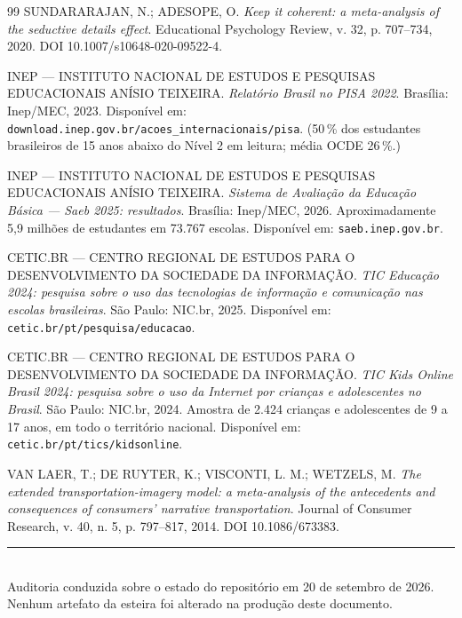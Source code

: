 \documentclass[11pt,a4paper]{article}
\begin{document}
\begin{thebibliography}{99}
SUNDARARAJAN, N.; ADESOPE, O.
\emph{Keep it coherent: a meta-analysis of the seductive details effect}.
Educational Psychology Review, v. 32, p. 707--734, 2020.
DOI 10.1007/s10648-020-09522-4.

INEP --- INSTITUTO NACIONAL DE ESTUDOS E PESQUISAS EDUCACIONAIS AN\'ISIO TEIXEIRA.
\emph{Relat\'orio Brasil no PISA 2022}. Bras\'ilia: Inep/MEC, 2023.
Dispon\'ivel em: \texttt{download.inep.gov.br/acoes\_internacionais/pisa}.
(50\,\% dos estudantes brasileiros de 15 anos abaixo do N\'ivel 2 em leitura; m\'edia OCDE 26\,\%.)

INEP --- INSTITUTO NACIONAL DE ESTUDOS E PESQUISAS EDUCACIONAIS AN\'ISIO TEIXEIRA.
\emph{Sistema de Avalia\c{c}\~ao da Educa\c{c}\~ao B\'asica --- Saeb 2025: resultados}.
Bras\'ilia: Inep/MEC, 2026. Aproximadamente 5,9 milh\~oes de estudantes em 73.767 escolas.
Dispon\'ivel em: \texttt{saeb.inep.gov.br}.

CETIC.BR --- CENTRO REGIONAL DE ESTUDOS PARA O DESENVOLVIMENTO DA SOCIEDADE DA INFORMA\c{C}\~AO.
\emph{TIC Educa\c{c}\~ao 2024: pesquisa sobre o uso das tecnologias de informa\c{c}\~ao e
comunica\c{c}\~ao nas escolas brasileiras}. S\~ao Paulo: NIC.br, 2025.
Dispon\'ivel em: \texttt{cetic.br/pt/pesquisa/educacao}.

CETIC.BR --- CENTRO REGIONAL DE ESTUDOS PARA O DESENVOLVIMENTO DA SOCIEDADE DA INFORMA\c{C}\~AO.
\emph{TIC Kids Online Brasil 2024: pesquisa sobre o uso da Internet por crian\c{c}as e
adolescentes no Brasil}. S\~ao Paulo: NIC.br, 2024. Amostra de 2.424 crian\c{c}as e adolescentes
de 9 a 17 anos, em todo o territ\'orio nacional.
Dispon\'ivel em: \texttt{cetic.br/pt/tics/kidsonline}.

VAN LAER, T.; DE RUYTER, K.; VISCONTI, L. M.; WETZELS, M.
\emph{The extended transportation-imagery model: a meta-analysis of the antecedents and
consequences of consumers' narrative transportation}.
Journal of Consumer Research, v. 40, n. 5, p. 797--817, 2014.
DOI 10.1086/673383.

\end{thebibliography}

\vspace{1cm}
\begin{center}
{\color{BorderGray}\rule{0.6\textwidth}{0.6pt}}\\[0.4cm]
{\small\color{Charcoal}
Auditoria conduzida sobre o estado do reposit\'orio em 20 de setembro de 2026.\\
Nenhum artefato da esteira foi alterado na produ\c{c}\~ao deste documento.}
\end{center}
\end{document}
